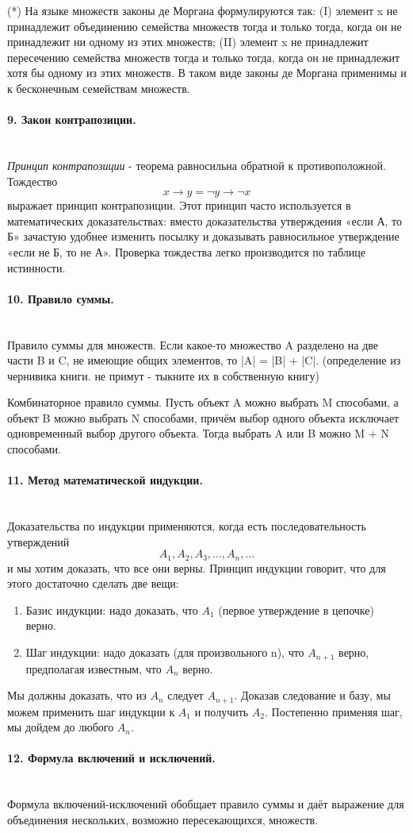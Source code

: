 \documentclass[a4paper, 12pt]{article}
\newcommand{\parag}[1]{\paragraph{#1}\mbox{}\\}
\begin{document}
\noindent
(*) На языке множеств законы де Моргана формулируются так: (I) элемент x не
принадлежит объединению семейства множеств тогда и только тогда, когда он не
принадлежит ни одному из этих множеств; (II) элемент x не принадлежит пересечению семейства множеств тогда и только тогда, когда он не принадлежит хотя бы одному из этих множеств. В таком виде законы де Моргана применимы и к
бесконечным семействам множеств.

\parag{9. Закон контрапозиции.}
\textit{Принцип контрапозиции} - теорема равносильна обратной к противоположной. Тождество $$x \to y = \neg y \to \neg x$$
выражает принцип контрапозиции. Этот принцип часто используется в математических доказательствах: вместо
доказательства утверждения «если А, то Б» зачастую удобнее изменить посылку
и доказывать равносильное утверждение «если не Б, то не А». Проверка тождества легко производится по таблице истинности.

\parag{10. Правило суммы.}
Правило суммы для множеств. Если какое-то множество A разделено на две части B
и C, не имеющие общих элементов, то |A| = |B| + |C|.
(определение из чернивика книги. не примут - тыкните их в собственную книгу)

\noindent
Комбинаторное правило суммы. Пусть объект A можно выбрать M способами, а объект B можно выбрать N способами, причём выбор одного объекта исключает одновременный выбор другого объекта. Тогда выбрать A или B можно M + N способами.

\parag{11. Метод математической индукции.}
Доказательства по индукции применяются, когда есть последовательность утверждений $$ A_{1}, A_{2}, A_{3}, ..., A_{n}, ... $$ и мы хотим доказать, что все они верны. Принцип индукции говорит, что для этого
достаточно сделать две вещи:
\begin{enumerate}
    \item Базис индукции: надо доказать, что $A_{1}$ (первое утверждение в цепочке) верно.
    \item Шаг индукции: надо доказать (для произвольного n), что $A_{n+1}$ верно, предполагая известным, что $A_{n}$ верно.
\end{enumerate}

\noindent
Мы должны доказать, что из $A_{n}$ следует $A_{n+1}$. Доказав следование и базу, мы можем применить шаг индукции к $A_{1}$ и получить $A_{2}$. Постепенно применяя шаг, мы дойдем до любого $A_{n}$.

\parag{12. Формула включений и исключений.}
Формула включений-исключений обобщает правило суммы и даёт выражение для объединения нескольких, возможно пересекающихся, множеств.
\end{document}
